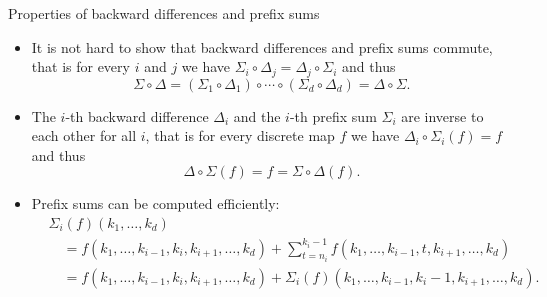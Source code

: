 \documentclass[
    t,10pt,
    handout
]{beamer}
\begin{document}
\begin{frame}{Properties of backward differences and prefix sums}
    \begin{itemize}[<+->]
        \item It is not hard to show that backward differences and prefix sums commute, that is for every \( i \) and \( j \) we have \( \Sigma_i \circ \Delta_j = \Delta_j \circ \Sigma_i \) and thus
            \begin{equation*}
                \Sigma \circ \Delta = (\Sigma_1 \circ \Delta_1) \circ \cdots \circ (\Sigma_d \circ \Delta_d) =  \Delta \circ \Sigma.
            \end{equation*}
        \item The \( i \)-th backward difference \( \Delta_i \) and the \( i \)-th prefix sum \( \Sigma_i \) are inverse to each other for all \( i \), that is for every discrete map \( f \) we have \( \Delta_i \circ \Sigma_i(f) = f \) and thus 
            \begin{equation*}
                \Delta \circ \Sigma(f) = f = \Sigma \circ \Delta(f). 
            \end{equation*}
        \item Prefix sums can be computed efficiently: 
            \begin{align*}
                &\Sigma_i(f)(k_1,\dots,k_d) \\
                &\quad = f(k_1,\dots,k_{i-1},k_i,k_{i+1},\dots,k_d) + \sum_{t=n_i}^{k_i-1} f(k_1,\dots,k_{i-1},t,k_{i+1},\dots,k_d) \\
                &\quad = f(k_1,\dots,k_{i-1},k_i,k_{i+1},\dots,k_d) + \Sigma_i(f)(k_1,\dots,k_{i-1},k_i-1,k_{i+1},\dots,k_d). 
            \end{align*}
    \end{itemize}
\end{frame}
\end{document}
